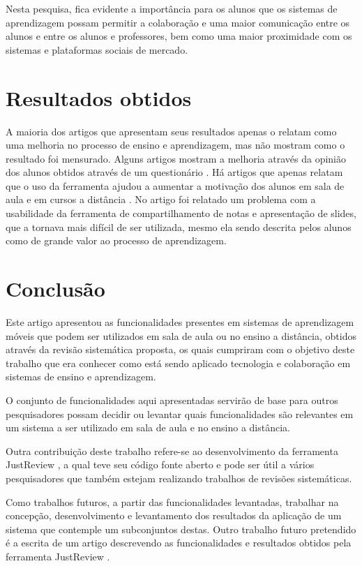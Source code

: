 Nesta pesquisa, fica evidente a importância para os alunos que os sistemas de aprendizagem possam permitir a colaboração e uma maior comunicação entre os alunos e entre os alunos e professores, bem como uma maior proximidade com os sistemas e plataformas sociais de mercado.

\section{Resultados obtidos}

A maioria dos artigos que apresentam seus resultados apenas o relatam como uma melhoria no processo de ensino e aprendizagem, mas não mostram como o resultado foi mensurado. Alguns artigos mostram a melhoria através da opinião dos alunos obtidos através de um questionário \cite{rawat_work_2008}. Há artigos que apenas relatam que o uso da ferramenta ajudou a aumentar a motivação dos alunos em sala de aula e em cursos a distância \cite{tokiwa_web-based_2009}.
No artigo \cite{singh_collaborative_2004} foi relatado um problema com a usabilidade da ferramenta de compartilhamento de notas e apresentação de slides, que a tornava mais difícil de ser utilizada, mesmo ela sendo descrita pelos alunos como de grande valor ao processo de aprendizagem.

\section{Conclusão}
Este artigo apresentou as funcionalidades presentes em sistemas de aprendizagem móveis que podem ser utilizados em sala de aula ou no ensino a distância, obtidos através da revisão sistemática proposta, os quais cumpriram com o objetivo deste trabalho que era conhecer como está sendo aplicado tecnologia e colaboração em sistemas de ensino e aprendizagem.

O conjunto de funcionalidades aqui apresentadas servirão de base para outros pesquisadores possam decidir ou levantar quais funcionalidades são relevantes em um sistema a ser utilizado em sala de aula e no ensino a distância.

Outra contribuição deste trabalho refere-se ao desenvolvimento da ferramenta JustReview \cite{tulio:2013}, a qual teve seu código fonte aberto e pode ser útil a vários pesquisadores que também estejam realizando trabalhos de revisões sistemáticas.

Como trabalhos futuros, a partir das funcionalidades levantadas, trabalhar na concepção, desenvolvimento e levantamento dos resultados da aplicação de um sistema que contemple um subconjuntos destas. Outro trabalho futuro pretendido é a escrita de um artigo descrevendo as funcionalidades e resultados obtidos pela ferramenta JustReview \cite{tulio:2013}.